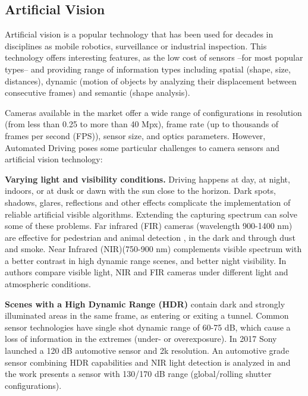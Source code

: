 \documentclass[journal]{IEEEtran}
\begin{document}
\subsection{Artificial Vision}
Artificial vision is a popular technology that has been used for decades in 
disciplines as mobile robotics, surveillance or industrial inspection. 
This technology offers interesting features, as the low cost of sensors 
--for most popular types-- and providing range of information types including
spatial (shape, size, distances), dynamic (motion of objects by analyzing their 
displacement between consecutive frames) and semantic (shape analysis).

Cameras available in the market offer a wide range of configurations in
resolution (from less than 0.25 to more than 40 Mpx), frame rate (up to
thousands of frames per second (FPS)), sensor size, and optics parameters.
However, Automated Driving poses some particular challenges to camera sensors
and artificial vision technology:

\textbf{Varying light and visibility conditions.} Driving happens at day, 
at night, indoors, or at dusk or dawn with the sun close to the horizon. 
Dark spots, shadows, glares, reflections and other effects complicate the
implementation of reliable artificial visible algorithms.
Extending the capturing spectrum can solve some of these problems. 
Far infrared (FIR) cameras (wavelength 900-1400 nm) 
are effective for pedestrian and animal detection
\cite{OMalley2008, Besbes2015}, in the dark and through dust and smoke.
Near Infrared (NIR)(750-900 nm) complements visible spectrum with a better
contrast in high dynamic range scenes, and better night visibility. 
In \cite{Pinchon2018} authors compare visible light, NIR and FIR cameras 
under different light and atmospheric conditions.

\textbf{Scenes with a High Dynamic Range (HDR)} contain dark and strongly
illuminated areas in the same frame, as entering or exiting a tunnel.
Common sensor technologies have single shot dynamic range of 60-75 dB,
which cause a loss of information in the extremes (under- or overexposure).
In 2017 Sony launched a 120 dB automotive sensor and 2k resolution.
An automotive grade sensor combining HDR capabilities and NIR
light detection is analyzed in \cite{Maddalena2005} and the work 
\cite{Strobel2013} presents a sensor with 130/170 dB range (global/rolling 
shutter configurations).
\end{document}
